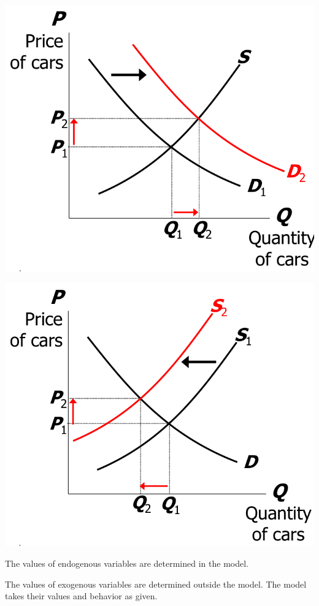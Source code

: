 \begin{minipage}{0.48\textwidth}
    \centering
    \includegraphics[width=0.8\linewidth]{image/The effects of an increase in income1.png}
\end{minipage}%
\begin{minipage}{0.48\textwidth}
    \centering
    \includegraphics[width=0.8\linewidth]{image/The effects of a steel price increase1.png}
\end{minipage}

\begin{definition}
    The values of endogenous variables are determined in the model.
\end{definition}
\begin{definition}
    The values of exogenous variables are determined outside the model. The model takes their values and behavior as given.
\end{definition}

